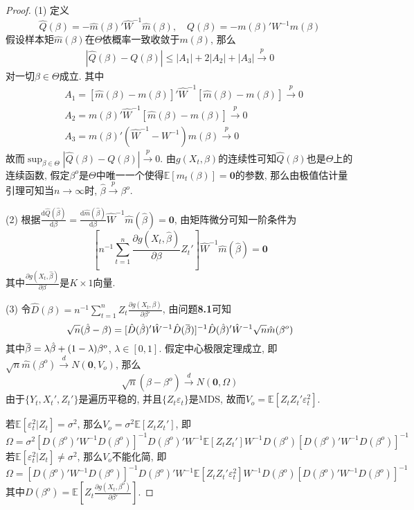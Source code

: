 \documentclass[cn,12pt,math=mtpro2,citestyle=gb7714-2015,bibstyle=gb7714-2015,twocol,mode=simple]{elegantbook}
\newcommand{\overbar}[1]{\mkern 1.5mu\overline{\mkern-1.5mu#1\mkern-1.5mu}\mkern 1.5mu}
\newcommand{\E}{\mathbb{E}}
\newcommand{\hbeta}{\hat{\beta}}
\newcommand{\hatm}{\hat{m}}
\newcommand{\dd}{\text{d}}
\begin{document}
   \begin{proof}
     (1) 定义
     $$\hat{Q}(\beta)=-\hatm(\beta)'\hat{W}^{-1}\hat{m}(\beta),\quad Q(\beta)=-m(\beta)'W^{-1}m(\beta)$$
     假设样本矩$\hat{m}(\beta)$在$\Theta$依概率一致收敛于$m(\beta)$, 那么
     \begin{align*}
     |\hat{Q}(\beta)-Q(\beta)|\leq |A_1|+2|A_2|+|A_3|\xrightarrow{p}0
     \end{align*}
     对一切$\beta\in\Theta$成立. 其中
     \begin{align*}
     &A_1=[\hat{m}(\beta)-m(\beta)]'\hat{W}^{-1}[\hat{m}(\beta)-m(\beta)]\xrightarrow{p}0 \\
     &A_2=m(\beta)'\hat{W}^{-1}[\hat{m}(\beta)-m(\beta)]\xrightarrow{p}0 \\
     &A_3=m(\beta)'(\hat{W}^{-1}-W^{-1})m(\beta)\xrightarrow{p}0
     \end{align*}
     故而$\displaystyle\sup_{\beta\in\Theta}|\hat{Q}(\beta)-Q(\beta)|\xrightarrow{p}0$. 由$g(X_t,\beta)$的连续性可知$\hat{Q}(\beta)$也是$\Theta$上的连续函数, 假定$\beta^o$是$\Theta$中唯一一个使得$\E[m_t(\beta)]=\mathbf{0}$的参数, 那么由极值估计量引理可知当$n\to\infty$时, $\hat{\beta}\xrightarrow{p}\beta^o$.

     (2) 根据$\displaystyle\frac{\dd\hat{Q}(\hbeta)}{\dd\beta}=\frac{\dd\hatm(\hbeta)}{\dd\beta}\hat{W}^{-1}\hatm(\hbeta)=\mathbf{0}$, 由矩阵微分可知一阶条件为
     $$\left[n^{-1}\sum_{t=1}^{n}\frac{\partial g(X_t,\hat{\beta})}{\partial \beta}Z_t'\right]\hat{W}^{-1}\hat{m}(\hbeta)=\mathbf{0}$$
     其中$\displaystyle\frac{\partial g(X_t,\hbeta)}{\partial \beta}$是$K\times 1$向量.

     (3) 令$\hat{D}(\beta)=\displaystyle n^{-1}\sum_{t=1}^{n}Z_t\frac{\partial g(X_t,\beta)}{\partial \beta'}$, 由问题\textbf{8.1}可知
     $$\sqrt{n}(\hat{\beta}-\beta)=[\hat{D}(\hat{\beta})'\hat{W}^{-1}\hat{D}(\overbar{\beta})]^{-1}\hat{D}(\hat{\beta})'\hat{W}^{-1}\sqrt{n}\hat{m}(\beta^o)$$
     其中$\overbar{\beta}=\lambda\hat{\beta}+(1-\lambda)\beta^o$, $\lambda\in[0,1]$. 假定中心极限定理成立, 即$\sqrt{n}\hat{m}(\beta^o)\xrightarrow{d}N(\mathbf{0},V_o)$, 那么
     $$\sqrt{n}(\hat{\beta}-\beta^o)\xrightarrow{d}N(\mathbf{0},\Omega)$$
     由于$\{Y_t,X_t',Z_t'\}$是遍历平稳的, 并且$\{Z_t\varepsilon_t\}$是MDS, 故而$V_o=\E[Z_tZ_t'\varepsilon_t^2]$.

     若$\E[\varepsilon_t^2|Z_t]=\sigma^2$, 那么$V_o=\sigma^2\E[Z_tZ_t']$, 即
     $$\Omega=\sigma^2[D(\beta^o)'W^{-1}D(\beta^o)]^{-1}D(\beta^o)'W^{-1}\E[Z_tZ_t']W^{-1}D(\beta^o)[D(\beta^o)'W^{-1}D(\beta^o)]^{-1}$$
     若$\E[\varepsilon_t^2|Z_t]\neq\sigma^2$, 那么$V_o$不能化简, 即
     $$\Omega=[D(\beta^o)'W^{-1}D(\beta^o)]^{-1}D(\beta^o)'W^{-1}\E[Z_tZ_t'\varepsilon_t^2]W^{-1}D(\beta^o)[D(\beta^o)'W^{-1}D(\beta^o)]^{-1}$$
     其中$\displaystyle D(\beta^o)=\E\left[Z_t\frac{\partial g(X_t,\beta^o)}{\partial \beta'}\right]$.


\end{proof}
\end{document}
